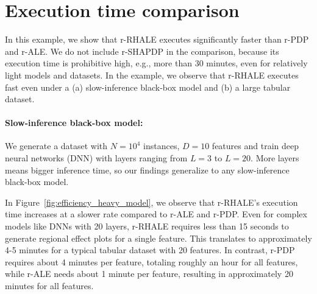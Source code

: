 \documentclass[sigconf, nonacm]{acmart}
\begin{document}


\section{Execution time comparison}
\label{sec:efficiency}


In this example, we show that r-RHALE executes significantly faster than r-PDP and r-ALE.
We do not include r-SHAPDP in the comparison, because its execution time is prohibitive high, e.g., more than 30 minutes, even for relatively light models and datasets. In the example, we observe that r-RHALE executes fast even under a (a) slow-inference black-box model and (b) a large tabular dataset.

\paragraph{Slow-inference black-box model:}

We generate a dataset with $N=10^4$ instances, $D=10$ features and train deep neural networks (DNN) with layers ranging from $L=3$ to $L=20$. More layers means bigger inference time, so our findings generalize to any slow-inference black-box model.

In Figure~\ref{fig:efficiency_heavy_model}, we observe that r-RHALE's execution time increases at a slower rate compared to r-ALE and r-PDP. Even for complex models like DNNs with 20 layers, r-RHALE requires less than 15 seconds to generate regional effect plots for a single feature. This translates to approximately 4-5 minutes for a typical tabular dataset with 20 features. In contrast, r-PDP requires about 4 minutes per feature, totaling roughly an hour for all features, while r-ALE needs about 1 minute per feature, resulting in approximately 20 minutes for all features.
\end{document}
